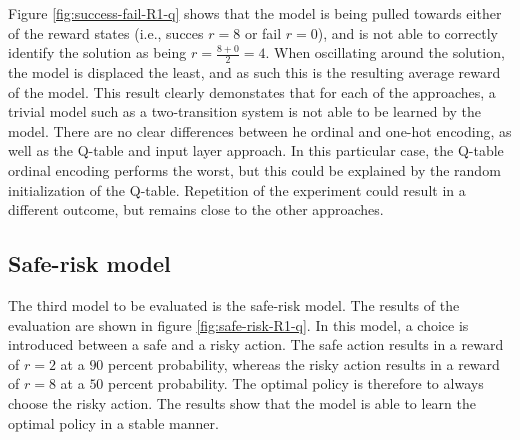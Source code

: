 Figure \ref{fig:success-fail-R1-q} shows that the model is being pulled towards either of the reward states (i.e., succes $r = 8$ or fail $r = 0$), and is not able to correctly identify the solution as being $r = \frac{8 + 0}{2} = 4$. When oscillating around the solution, the model is displaced the least, and as such this is the resulting average reward of the model. This result clearly demonstates that for each of the approaches, a trivial model such as a two-transition system is not able to be learned by the model. There are no clear differences between he ordinal and one-hot encoding, as well as the Q-table and input layer approach. In this particular case, the Q-table ordinal encoding performs the worst, but this could be explained by the random initialization of the Q-table. Repetition of the experiment could result in a different outcome, but remains close to the other approaches.

\subsection{Safe-risk model}

The third model to be evaluated is the safe-risk model. The results of the evaluation are shown in figure \ref{fig:safe-risk-R1-q}. In this model, a choice is introduced between a safe and a risky action. The safe action results in a reward of $r = 2$ at a $90$ percent probability, whereas the risky action results in a reward of $r = 8$ at a $50$ percent probability. The optimal policy is therefore to always choose the risky action. The results show that the model is able to learn the optimal policy in a stable manner.

